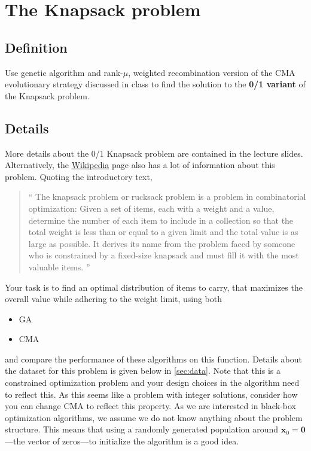 \documentclass[11pt]{article}
\begin{document}
\section{The Knapsack problem}
\label{sec:org23ab825}
\subsection{Definition}
\label{sec:orgbe35753}
  Use genetic algorithm and rank-\(\mu\), weighted recombination version of the CMA
evolutionary strategy discussed in class to find the solution to the \textbf{0/1 variant} of
the Knapsack problem.
\subsection{Details}
\label{sec:org8adf41d}
More details about the 0/1 Knapsack problem are contained in the lecture slides.
Alternatively, the \href{https://en.wikipedia.org/wiki/Knapsack\_problem}{Wikipedia} page also has a lot of information about this
problem. Quoting the introductory text,
\begin{quote}
`` The knapsack problem or rucksack problem is a problem in combinatorial
optimization: Given a set of items, each with a weight and a value, determine
the number of each item to include in a collection so that the total weight is
less than or equal to a given limit and the total value is as large as possible.
It derives its name from the problem faced by someone who is constrained by a
fixed-size knapsack and must fill it with the most valuable items. ''
\end{quote}

Your task is to find an optimal distribution of items to carry, that
maximizes the overall value while adhering to the weight limit, using both
\begin{itemize}
\item GA
\item CMA
\end{itemize}
and compare the performance of these algorithms on this function. Details about
the dataset for this problem is given below in \cref{sec:data}. Note that this is a constrained
optimization problem and your design choices in the
algorithm need to reflect this. As this seems like a problem with integer
solutions, consider how you can change CMA to reflect this property. As we are
interested in black-box optimization algorithms, we assume we do not know
anything about the problem structure. This means that using a randomly generated
population around \(\mathbf{x}_0 =\mathbf{0}\)---the vector of zeros---to
initialize the algorithm is a good idea.
\end{document}
